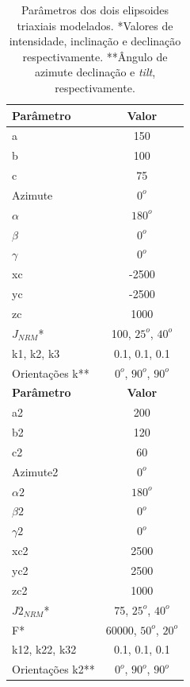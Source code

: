 \begin{table}[h]
	\begin{center}
		\begin{tabular}{|l|c|}
			\hline
			\textbf{Parâmetro}  & \textbf{Valor}  \\
			\hline 
			a   & 150 \\
			\hline
			b   & 100  \\
			\hline
			c   & 75 \\
			\hline
			Azimute   & $0^o$ \\
			\hline
			$\alpha$    & $180^o$   \\
			\hline
			$\beta$    & $0^o$ \\
			\hline
			$\gamma$   & $0^o$  \\
			\hline
			xc   & -2500  \\
			\hline          
			yc   & -2500  \\
			\hline                
			zc   & 1000  \\
			\hline
			$J_{NRM}$*  & 100, $25^o$, $40^o$  \\
			\hline
			k1, k2, k3   & 0.1, 0.1, 0.1  \\
			\hline
			Orientações k**   & $0^o$, $90^o$, $90^o$  \\
			\hline
			\textbf{Parâmetro}  & \textbf{Valor}  \\
			\hline 
			a2   & 200 \\
			\hline
			b2   & 120 \\
			\hline
			c2   & 60 \\
			\hline
			Azimute2   & $0^o$ \\
			\hline
			$\alpha2$    & $180^o$   \\
			\hline
			$\beta2$    & $0^o$ \\
			\hline
			$\gamma2$   & $0^o$  \\
			\hline
			xc2   & 2500  \\
			\hline          
			yc2   & 2500  \\
			\hline                
			zc2   & 1000  \\
			\hline
			$J2_{NRM}$*  & 75, $25^o$, $40^o$  \\
			\hline
			F*    & 60000, $50^o$, $20^o$ \\
			\hline
			k12, k22, k32   & 0.1, 0.1, 0.1  \\
			\hline
			Orientações k2**   & $0^o$, $90^o$, $90^o$  \\
			\hline			
		\end{tabular}
		\caption{Parâmetros dos dois elipsoides triaxiais modelados. *Valores de intensidade, inclinação e 
			declinação respectivamente. **Ângulo de azimute	declinação e \textit{tilt}, respectivamente.}
	\end{center}
	\label{tab:ellipsoid_triaxial_multi}
\end{table}

